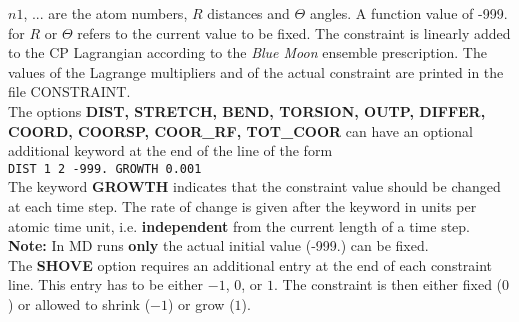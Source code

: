 \documentclass[twoside,10pt,titlepage,a4paper]{article}
\begin{document}
\begin{description}
\begin{description}
          \end{description}
          $n1$, ... are the atom numbers, $R$ distances and $\Theta$ angles.
             A function value of -999. for $R$ or $\Theta$ refers to the
             current value to be fixed. The constraint is linearly added
             to the CP Lagrangian according to the {\it Blue Moon} ensemble
             prescription\cite{Sprik98b}. The values of the Lagrange
             multipliers and of the actual constraint are printed in the file
             CONSTRAINT.\\
             The options {\bf DIST, STRETCH, BEND, TORSION, OUTP, DIFFER, COORD,
             COORSP, COOR\_RF, TOT\_COOR} can have
             an optional additional keyword at the end of the line of the form \\
             {\tt DIST  1 2 -999.  GROWTH  0.001 }\\
             The keyword {\bf GROWTH} indicates that the constraint value should be
             changed at each time step. The rate of change is given after the keyword
             in units per atomic time unit, i.e. {\bf independent} from
             the current length of a time step.\\
             {\bf Note:} In MD runs {\bf only} the actual initial value
             (-999.) can be fixed.\\
             The {\bf SHOVE} option requires an additional entry at the end
             of each constraint line. This entry has to be either
             $-1$, $0$, or $1$. The constraint is then either fixed ($0$)
             or allowed to shrink ($-1$) or grow ($1$).


\end{description}
\end{document}
